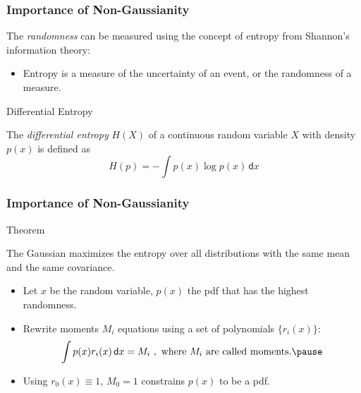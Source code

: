 \begin{frame}
  \frametitle{Importance of Non-Gaussianity}

  The \textit{randomness} can be measured using the concept of entropy from Shannon's information theory:
  
  \begin{itemize}
    \item Entropy is a measure of the uncertainty of an event, or the randomness of a measure.
  \end{itemize}
  \spread

  \begin{citeblock}{Differential Entropy}
  
  The \textit{differential entropy} $H(X)$ of a continuous random variable $X$ with density $p(x)$ is defined as
    \begin{displaymath}
      H(p) = - \int p(x) \log p(x) \,\mathsf{d}x
    \end{displaymath}
  \end{citeblock}

\end{frame}


\begin{frame}
  \frametitle{Importance of Non-Gaussianity \cont}

  \begin{citeblock}{Theorem}

    The Gaussian maximizes the entropy over all distributions with the same mean and the same covariance.
  \end{citeblock}
  \pspread

   \pause

  \begin{itemize}
    \item Let $x$ be the random variable, $p(x)$ the pdf that has the highest randomness. \pause
    \item Rewrite moments $M_i$ equations using a set of polynomials $\{ r_i(x) \}$:
      \begin{displaymath}
        \int p(x) r_i(x) \,\mathsf{d}x = M_i ~,~\mbox{where}~M_i~\mbox{are called moments}. \pause 
      \end{displaymath} 
    \item Using $r_0(x) \equiv 1$, $M_0 = 1$ constrains $p(x)$ to be a pdf.
  \end{itemize}
\end{frame}


